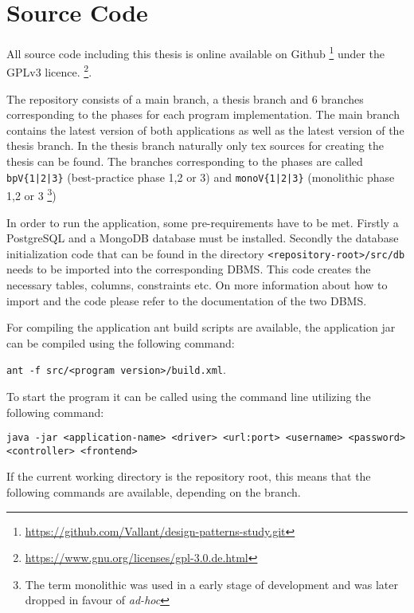 \chapter{Source Code}
All source code including this thesis is online available on Github \footnote{\href{https://github.com/Vallant/design-patterns-study.git}{https://github.com/Vallant/design-patterns-study.git}} under the GPLv3 licence. \footnote{\href{https://www.gnu.org/licenses/gpl-3.0.de.html}{https://www.gnu.org/licenses/gpl-3.0.de.html}}.

The repository consists of a main branch, a thesis branch and 6 branches corresponding to the phases for each program implementation. The main branch contains the latest version of both applications as well as the latest version of the thesis branch. In the thesis branch naturally only tex sources for creating the thesis can be found. The branches corresponding to the phases are called \texttt{bpV\{1|2|3\}} (best-practice phase 1,2 or 3) and \texttt{monoV\{1|2|3\}} (monolithic phase 1,2 or 3 \footnote{The term monolithic was used in a early stage of development and was later dropped in favour of \emph{ad-hoc}})

In order to run the application, some pre-requirements have to be met. Firstly a PostgreSQL and a MongoDB database must be installed. Secondly the database initialization code that can be found in the directory \texttt{<repository-root>/src/db} needs to be imported into the corresponding DBMS. This code creates the necessary tables, columns, constraints etc. On more information about how to import and the code please refer to the documentation of the two DBMS.

For compiling the application ant build scripts are available, the application jar can be compiled using the following command:

\texttt{ant -f src/<program version>/build.xml}.


To start the program it can be called using the command line utilizing the following command:

\texttt{java -jar <application-name> <driver> <url:port> <username> <password> <controller> <frontend>}

If the current working directory is the repository root, this means that the following commands are available, depending on the branch.

